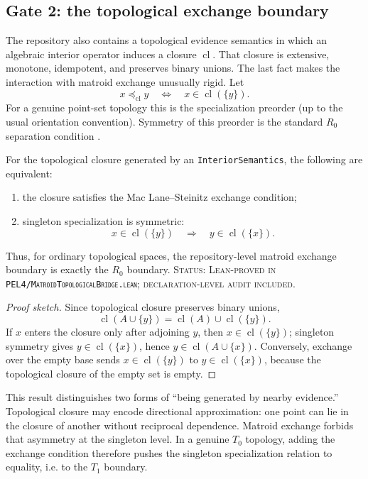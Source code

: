 \subsection{Gate 2: the topological exchange boundary}
\label{sec:matroid-topological-boundary}

The repository also contains a topological evidence semantics in which an
algebraic interior operator induces a closure \(\operatorname{cl}\). That closure
is extensive, monotone, idempotent, and preserves binary unions. The last fact
makes the interaction with matroid exchange unusually rigid. Let
\[
  x\preceq_{\operatorname{cl}} y
  \quad\Longleftrightarrow\quad
  x\in\operatorname{cl}(\{y\}).
\]
For a genuine point-set topology this is the specialization preorder (up to the
usual orientation convention). Symmetry of this preorder is the standard
\(R_0\) separation condition \cite{Willard1970}.

\begin{theorem}
For the topological closure generated by an \texttt{InteriorSemantics}, the
following are equivalent:
\begin{enumerate}[label=(\roman*)]
  \item the closure satisfies the Mac Lane--Steinitz exchange condition;
  \item singleton specialization is symmetric:
  \[
    x\in\operatorname{cl}(\{y\})
    \quad\Longrightarrow\quad
    y\in\operatorname{cl}(\{x\}).
  \]
\end{enumerate}
Thus, for ordinary topological spaces, the repository-level matroid exchange
boundary is exactly the \(R_0\) boundary.
\textup{\textsc{Status: Lean-proved in
\texttt{PEL4/MatroidTopologicalBridge.lean}; declaration-level audit included.}}
\end{theorem}
\begin{proof}[Proof sketch]
Since topological closure preserves binary unions,
\[
  \operatorname{cl}(A\cup\{y\})
  =\operatorname{cl}(A)\cup\operatorname{cl}(\{y\}).
\]
If \(x\) enters the closure only after adjoining \(y\), then
\(x\in\operatorname{cl}(\{y\})\); singleton symmetry gives
\(y\in\operatorname{cl}(\{x\})\), hence
\(y\in\operatorname{cl}(A\cup\{x\})\). Conversely, exchange over the empty
base sends \(x\in\operatorname{cl}(\{y\})\) to
\(y\in\operatorname{cl}(\{x\})\), because the topological closure of the empty
set is empty.
\end{proof}

This result distinguishes two forms of ``being generated by nearby evidence.''
Topological closure may encode directional approximation: one point can lie in
the closure of another without reciprocal dependence. Matroid exchange forbids
that asymmetry at the singleton level. In a genuine \(T_0\) topology, adding the
exchange condition therefore pushes the singleton specialization relation to
equality, i.e. to the \(T_1\) boundary.

